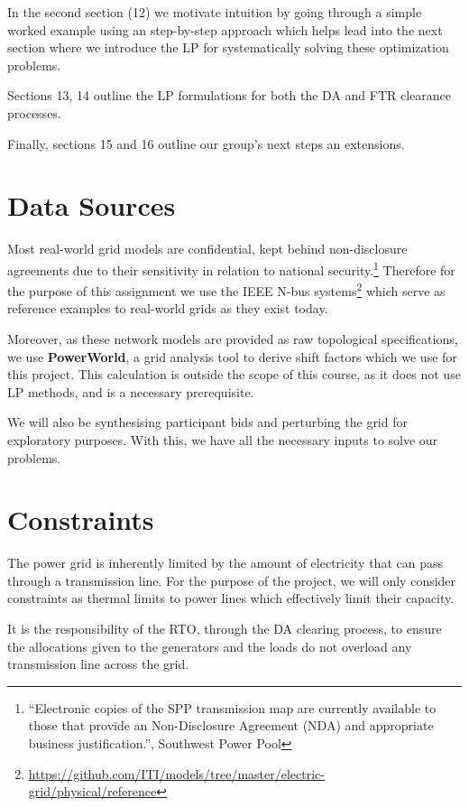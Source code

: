\documentclass[11pt]{article}
\begin{document}
In the second section (12) we motivate intuition by going through a simple worked example using an step-by-step approach which helps lead into the next section where we introduce the LP for systematically solving these optimization problems.

Sections 13, 14 outline the LP formulations for both the DA and FTR clearance processes.

Finally, sections 15 and 16 outline our group's next steps an extensions.

\newpage


\section{Data Sources}
Most real-world grid models are confidential, kept behind non-disclosure agreements due to their sensitivity in relation to national security.\footnote{``Electronic copies of the SPP transmission map are currently available to those that provide an Non-Disclosure Agreement (NDA) and appropriate business justification.'', Southwest Power Pool} Therefore for the purpose of this assignment we use the IEEE N-bus systems\footnote{\url{https://github.com/ITI/models/tree/master/electric-grid/physical/reference}} which serve as reference examples to real-world grids as they exist today.

Moreover, as these network models are provided as raw topological specifications, we use \textbf{PowerWorld}, a grid analysis tool to derive shift factors which we use for this project. This calculation is outside the scope of this course, as it does not use LP methods, and is a necessary prerequisite.

We will also be synthesising participant bids and perturbing the grid for exploratory purposes. With this, we have all the necessary inputs to solve our problems.

\section{Constraints}
The power grid is inherently limited by the amount of electricity that can pass through a transmission line. For the purpose of the project, we will only consider constraints as thermal limits to power lines which effectively limit their capacity.

It is the responsibility of the RTO, through the DA clearing process, to ensure the allocations given to the generators and the loads do not overload any transmission line across the grid.
\end{document}
